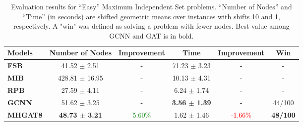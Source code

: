 \begin{table*}[htb!]
    \centering
    \begin{tabular}{|l c c c c c|}
        \hline
        \textbf{Models} & \textbf{Number of Nodes} & \textbf{Improvement} & \textbf{Time} & \textbf{Improvement} & \textbf{Win}\\
        \hline
        \textbf{FSB} & 41.52 $\pm$ 2.51 & - & 71.23 $\pm$ 3.23 & - & -\\
        \textbf{MIB} & 428.81 $\pm$ 16.95 & - & 10.13 $\pm$ 4.31 & - & -\\
        \textbf{RPB} & 27.59 $\pm$ 4.11 & - & 6.24 $\pm$ 1.74 & - & -\\
        \hline
        \textbf{GCNN} & 51.62 $\pm$ 3.25 & - & \textbf{3.56 $\pm$ 1.39} & - & 44/100\\
        \textbf{MHGAT8} & \textbf{48.73 $\pm$ 3.21} & \textcolor{green}{5.60\%} & 1.62 $\pm$ 1.46 & \textcolor{red}{-1.66\%} & \textbf{48/100}\\
        \hline
    \end{tabular}
    \caption{Evaluation results for “Easy” Maximum Independent Set problems. “Number of Nodes” and “Time” (in seconds) are shifted geometric means over instances with shifts 10 and 1, respectively.
    A "win" was defined as solving a problem with fewer nodes.
    Best value among GCNN and GAT is in bold.}
    \label{tab:is-results-easy}
\end{table*}